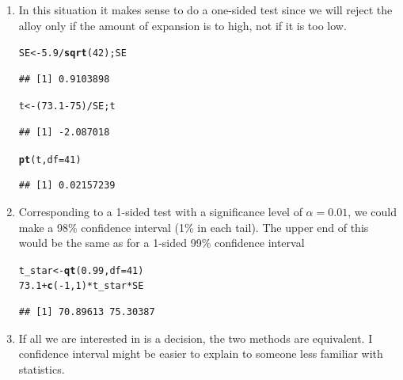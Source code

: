 \documentclass[twoside]{book}\usepackage[]{graphicx}\usepackage[]{xcolor}
\makeatletter
\newcommand{\hlnum}[1]{\textcolor[rgb]{0.686,0.059,0.569}{#1}}%
\newcommand{\hlopt}[1]{\textcolor[rgb]{0,0,0}{#1}}%
\newcommand{\hlstd}[1]{\textcolor[rgb]{0.345,0.345,0.345}{#1}}%
\newcommand{\hlkwb}[1]{\textcolor[rgb]{0.69,0.353,0.396}{#1}}%
\newcommand{\hlkwc}[1]{\textcolor[rgb]{0.333,0.667,0.333}{#1}}%
\newcommand{\hlkwd}[1]{\textcolor[rgb]{0.737,0.353,0.396}{\textbf{#1}}}%
\newenvironment{kframe}{%
 \def\at@end@of@kframe{}%
 \ifinner\ifhmode%
  \def\at@end@of@kframe{\end{minipage}}%
  \begin{minipage}{\columnwidth}%
 \fi\fi%
 \def\FrameCommand##1{\hskip\@totalleftmargin \hskip-\fboxsep
 \colorbox{shadecolor}{##1}\hskip-\fboxsep
     \hskip-\linewidth \hskip-\@totalleftmargin \hskip\columnwidth}%
 \MakeFramed {\advance\hsize-\width
   \@totalleftmargin\z@ \linewidth\hsize
   \@setminipage}}%
 {\par\unskip\endMakeFramed%
 \at@end@of@kframe}
\newenvironment{knitrout}{}{} %
\makeatother
\begin{document}
\begin{solution}
	\begin{enumerate}
		\item
			In this situation it makes sense to do a one-sided test since we will reject
			the alloy only if the amount of expansion is to high, not if it is too low.
\begin{knitrout}
\color{fgcolor}\begin{kframe}
\begin{alltt}
\hlstd{SE} \hlkwb{<-} \hlnum{5.9}\hlopt{/}\hlkwd{sqrt}\hlstd{(}\hlnum{42}\hlstd{); SE}
\end{alltt}
\begin{verbatim}
## [1] 0.9103898
\end{verbatim}
\begin{alltt}
\hlstd{t} \hlkwb{<-} \hlstd{(}\hlnum{73.1} \hlopt{-} \hlnum{75}\hlstd{)} \hlopt{/} \hlstd{SE; t}
\end{alltt}
\begin{verbatim}
## [1] -2.087018
\end{verbatim}
\begin{alltt}
\hlkwd{pt}\hlstd{(t,} \hlkwc{df}\hlstd{=}\hlnum{41}\hlstd{)}
\end{alltt}
\begin{verbatim}
## [1] 0.02157239
\end{verbatim}
\end{kframe}
\end{knitrout}
		\item
			Corresponding to a 1-sided test with a significance level of $\alpha = 0.01$,
			we could make a 98\% confidence interval (1\% in each tail).  The upper end of this
			would be the same as for a 1-sided 99\% confidence interval
\begin{knitrout}
\color{fgcolor}\begin{kframe}
\begin{alltt}
\hlstd{t_star} \hlkwb{<-} \hlkwd{qt}\hlstd{(}\hlnum{0.99}\hlstd{,} \hlkwc{df} \hlstd{=} \hlnum{41}\hlstd{)}
\hlnum{73.1} \hlopt{+} \hlkwd{c}\hlstd{(}\hlopt{-}\hlnum{1}\hlstd{,} \hlnum{1}\hlstd{)} \hlopt{*} \hlstd{t_star} \hlopt{*} \hlstd{SE}
\end{alltt}
\begin{verbatim}
## [1] 70.89613 75.30387
\end{verbatim}
\end{kframe}
\end{knitrout}
		\item
			If all we are interested in is a decision, the two methods are equivalent.
			I confidence interval might be easier to explain to someone less familiar with
			statistics.
	\end{enumerate}

\end{solution}
\end{document}
